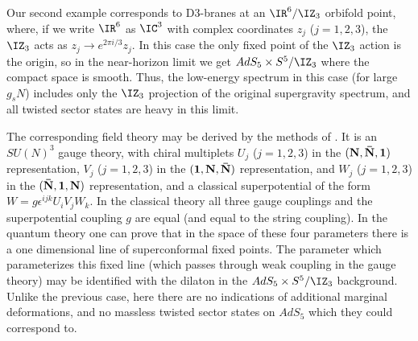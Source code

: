 Our second example corresponds to D3-branes at an $\IR^6/\IZ_3$
orbifold point, where, if we write $\IR^6$ as $\IC^3$ with complex
coordinates $z_j$ ($j=1,2,3$), the $\IZ_3$ acts as $z_j \to e^{2\pi
i/3} z_j$. In this case the only fixed point of the $\IZ_3$ action is
the origin, so in the near-horizon limit we get \cite{Kachru:1998ys}
$AdS_5\times S^5/\IZ_3$ where the compact space is smooth. Thus, the
low-energy spectrum in this case (for large $g_s N$) includes only the
$\IZ_3$ projection of the original supergravity spectrum, and all
twisted sector states are heavy in this limit.

The corresponding field theory may be derived by the methods of
\cite{Douglas:1996sw,Douglas:1997de}. 
It is an $SU(N)^3$ gauge theory, with chiral multiplets $U_j$
($j=1,2,3$) in the $\bf{(N,{\bar N},1)}$ representation, $V_j$
($j=1,2,3$) in the $\bf{(1,N,{\bar N})}$ representation, and $W_j$
($j=1,2,3$) in the $\bf{({\bar N},1,N)}$ representation, and a
classical superpotential of the form $W = g\epsilon^{ijk} U_i V_j
W_k$. In the classical theory all three gauge couplings and the
superpotential coupling $g$ are equal (and equal to the string
coupling). In the quantum theory one can prove that in the space of
these four parameters there is a one dimensional line of
superconformal fixed points. The parameter which parameterizes this fixed
line (which passes through weak coupling in the gauge theory) may be
identified with the dilaton in the $AdS_5\times S^5/\IZ_3$
background. Unlike the previous case, here there are no indications of
additional marginal deformations, and no massless twisted sector
states on $AdS_5$ which they could correspond to.


